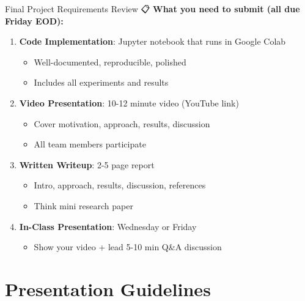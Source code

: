 \documentclass[aspectratio=169]{beamer}
\begin{document}
\begin{frame}[shrink=10]{Final Project Requirements Review 📋}
\textbf{What you need to submit (all due Friday EOD):}

\begin{enumerate}\setlength{\itemsep}{0pt}
    \item \textbf{Code Implementation}: Jupyter notebook that runs in Google Colab
    \begin{itemize}\setlength{\itemsep}{0pt}
        \item Well-documented, reproducible, polished
        \item Includes all experiments and results
    \end{itemize}

    \item \textbf{Video Presentation}: 10-12 minute video (YouTube link)
    \begin{itemize}\setlength{\itemsep}{0pt}
        \item Cover motivation, approach, results, discussion
        \item All team members participate
    \end{itemize}

    \item \textbf{Written Writeup}: 2-5 page report
    \begin{itemize}\setlength{\itemsep}{0pt}
        \item Intro, approach, results, discussion, references
        \item Think mini research paper
    \end{itemize}

    \item \textbf{In-Class Presentation}: Wednesday or Friday
    \begin{itemize}\setlength{\itemsep}{0pt}
        \item Show your video + lead 5-10 min Q\&A discussion
    \end{itemize}
\end{enumerate}
\end{frame}

\section{Presentation Guidelines}
\end{document}
